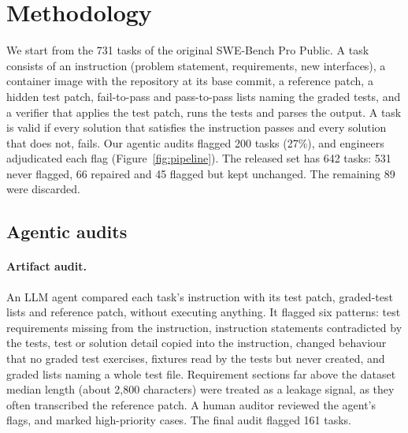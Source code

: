 \section{Methodology}
\label{sec:method}

We start from the 731 tasks of the original SWE-Bench Pro Public. A task consists of an instruction (problem statement, requirements, new interfaces), a container image with the repository at its base commit, a reference patch, a hidden test patch, fail-to-pass and pass-to-pass lists naming the graded tests, and a verifier that applies the test patch, runs the tests and parses the output. A task is valid if every solution that satisfies the instruction passes and every solution that does not, fails. Our agentic audits flagged 200 tasks (27\%), and engineers adjudicated each flag (Figure~\ref{fig:pipeline}). The released set has 642 tasks: 531 never flagged, 66 repaired and 45 flagged but kept unchanged. The remaining 89 were discarded.



\subsection{Agentic audits}
\label{sec:audits}

\paragraph{Artifact audit.}
An LLM agent compared each task's instruction with its test patch, graded-test lists and reference patch, without executing anything. It flagged six patterns: test requirements missing from the instruction, instruction statements contradicted by the tests, test or solution detail copied into the instruction, changed behaviour that no graded test exercises, fixtures read by the tests but never created, and graded lists naming a whole test file. Requirement sections far above the dataset median length (about 2{,}800 characters) were treated as a leakage signal, as they often transcribed the reference patch. A human auditor reviewed the agent's flags, and marked high-priority cases. The final audit flagged 161 tasks. 

